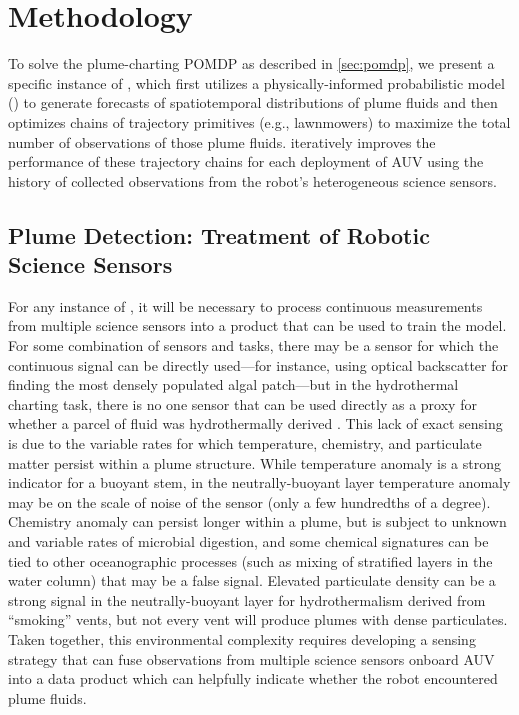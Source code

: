 \section{Methodology}
\label{sec:methods}
To solve the plume-charting POMDP as described in \cref{sec:pomdp}, we present a specific instance of \PHORTEX, which first utilizes a physically-informed probabilistic model (\PHUMES) to generate forecasts of spatiotemporal distributions of plume fluids and then optimizes chains of trajectory primitives (e.g., lawnmowers) to maximize the total number of observations of those plume fluids. \PHORTEX iteratively improves the performance of these trajectory chains for each deployment of AUV \Sentry using the history of collected observations from the robot's heterogeneous science sensors.


\subsection{Plume Detection: Treatment of Robotic Science Sensors}
\label{sec:sensor_models}
For any instance of \PHORTEX, it will be necessary to process continuous measurements from multiple science sensors into a product that can be used to train the \PHUMES model. For some combination of sensors and tasks, there may be a sensor for which the continuous signal can be directly used---for instance, using optical backscatter for finding the most densely populated algal patch---but in the hydrothermal charting task, there is no one sensor that can be used directly as a proxy for whether a parcel of fluid was hydrothermally derived \cite{jakuba2007stochastic}. This lack of exact sensing is due to the variable rates for which temperature, chemistry, and particulate matter persist within a plume structure. While temperature anomaly is a strong indicator for a buoyant stem, in the neutrally-buoyant layer temperature anomaly may be on the scale of noise of the sensor (only a few hundredths of a degree). Chemistry anomaly can persist longer within a plume, but is subject to unknown and variable rates of microbial digestion, and some chemical signatures can be tied to other oceanographic processes (such as mixing of stratified layers in the water column) that may be a false signal. Elevated particulate density can be a strong signal in the neutrally-buoyant layer for hydrothermalism derived from ``smoking'' vents, but not every vent will produce plumes with dense particulates. Taken together, this environmental complexity requires developing a sensing strategy that can fuse observations from multiple science sensors onboard AUV \Sentry into a data product which can helpfully indicate whether the robot encountered plume fluids. 

